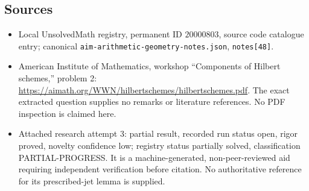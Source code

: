 \documentclass[11pt]{article}
\begin{document}
\subsection{Sources}
\begin{itemize}
\item Local UnsolvedMath registry, permanent ID $20000803$, source code catalogue entry; canonical \texttt{aim-arithmetic-geometry-notes.json}, \texttt{notes[48]}.
\item American Institute of Mathematics, workshop ``Components of Hilbert schemes,'' problem 2: \url{https://aimath.org/WWN/hilbertschemes/hilbertschemes.pdf}. The exact extracted question supplies no remarks or literature references. No PDF inspection is claimed here.
\item Attached research attempt 3: partial result, recorded run status open, rigor proved, novelty confidence low; registry status partially solved, classification PARTIAL-PROGRESS. It is a machine-generated, non-peer-reviewed aid requiring independent verification before citation. No authoritative reference for its prescribed-jet lemma is supplied.
\end{itemize}
\end{document}
